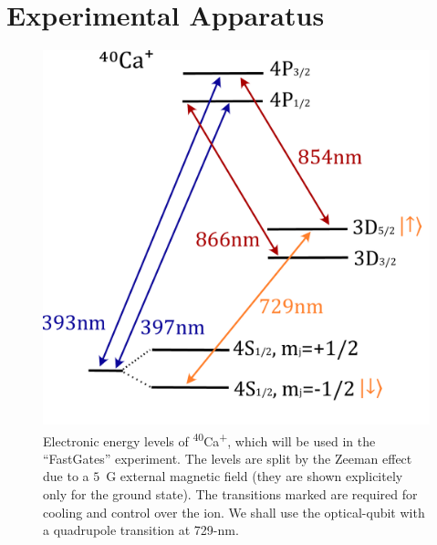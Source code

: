 \documentclass[12pt]{iopart}
\begin{document}


\section{Experimental Apparatus}

\begin{figure}[ht]
  \begin{center}
   \noindent\includegraphics[width=0.4\linewidth]{figures/Ca40.pdf}
  \end{center}
  \caption{
Electronic energy levels of \textsuperscript{40}Ca\textsuperscript{+},
which will be used in the ``FastGates'' experiment. The levels are
split by the Zeeman effect due to a $5$~G external magnetic field (they are shown explicitely only for the ground state). The
transitions marked are required for cooling and control over the
ion. We shall use the optical-qubit with a quadrupole transition at
729-nm.
  }

  \label{fig:ion}
\end{figure}
\end{document}
